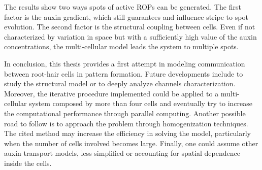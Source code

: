 The results show two ways spots of active ROPs can be generated. The first factor is the auxin gradient, which still guarantees and influence stripe to spot evolution. The second factor is the structural coupling between cells. Even if not characterized by variation in space but with a sufficiently high value of the auxin concentrations, the multi-cellular model leads the system to multiple spots.

In conclusion, this thesis provides a first attempt in modeling communication between root-hair cells in pattern formation. Future developments include to study the structural model or to deeply analyze channels characterization. Moreover, the iterative procedure implemented could be applied to a multi-cellular system composed by more than four cells and eventually try to increase the computational performance through parallel computing. Another possible road to follow is to approach the problem through homogenization techniques. The cited method may increase the efficiency in solving the model, particularly when the number of cells involved becomes large. Finally, one could assume other auxin transport models, less simplified or accounting for spatial dependence inside the cells.
